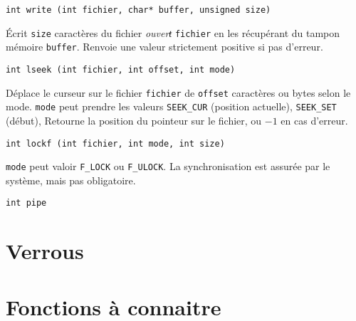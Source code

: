 \documentclass[a4paper]{article}
\begin{document}
\begin{multicols*}{2}
    \begin{lstlisting}
int write (int fichier, char* buffer, unsigned size)
    \end{lstlisting}
    \'Ecrit \texttt{size} caractères du fichier \emph{ouverŧ} \texttt{fichier} en les récupérant du tampon mémoire \texttt{buffer}.
    Renvoie une valeur strictement positive si pas d'erreur.

    \begin{lstlisting}
int lseek (int fichier, int offset, int mode)
    \end{lstlisting}
    D\'eplace le curseur sur le fichier \texttt{fichier} de \texttt{offset} caractères ou bytes selon le mode.
    \texttt{mode} peut prendre les valeurs \texttt{SEEK\_CUR} (position actuelle), \texttt{SEEK\_SET} (début),
    Retourne la position du pointeur sur le fichier, ou $-1$ en cas d'erreur.

    \begin{lstlisting}
int lockf (int fichier, int mode, int size)
    \end{lstlisting}
    \texttt{mode} peut valoir \texttt{F\_LOCK} ou \texttt{F\_ULOCK}.
    La synchronisation est assurée par le système, mais pas obligatoire.

    \begin{lstlisting}
int pipe
    \end{lstlisting}








    \section{Verrous}

    \section{Fonctions à connaitre}



\end{multicols*}
\end{document}
